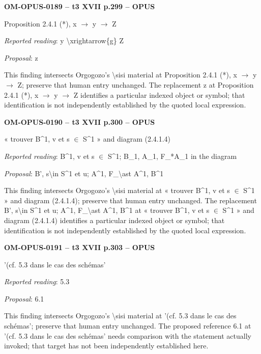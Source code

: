 \par\noindent\textbf{OM-OPUS-0189 -- t3 XVII p.299 -- OPUS}\par
Proposition 2.4.1 (*), x \ensuremath{\to} y \ensuremath{\to} Z\par
\emph{Reported reading}: y \textbackslash{}xrightarrow\{g\} Z\par
\emph{Proposal}: z\par
This finding intersects Orgogozo's \textbackslash{}sisi material at Proposition 2.4.1 (*), x \ensuremath{\to} y \ensuremath{\to} Z; preserve that human entry unchanged. The replacement z at Proposition 2.4.1 (*), x \ensuremath{\to} y \ensuremath{\to} Z identifies a particular indexed object or symbol; that identification is not independently established by the quoted local expression.\par
\par\noindent\textbf{OM-OPUS-0190 -- t3 XVII p.300 -- OPUS}\par
« trouver B\textasciicircum{}1, v et s \ensuremath{\in} S\textasciicircum{}1 » and diagram (2.4.1.4)\par
\emph{Reported reading}: B\textasciicircum{}1, v et s \ensuremath{\in} S\textasciicircum{}1; B\_1, A\_1, F\_*A\_1 in the diagram\par
\emph{Proposal}: B', s\textbackslash{}in S\textasciicircum{}1 et u; A\textasciicircum{}1, F\_\textbackslash{}ast A\textasciicircum{}1, B\textasciicircum{}1\par
This finding intersects Orgogozo's \textbackslash{}sisi material at « trouver B\textasciicircum{}1, v et s \ensuremath{\in} S\textasciicircum{}1 » and diagram (2.4.1.4); preserve that human entry unchanged. The replacement B', s\textbackslash{}in S\textasciicircum{}1 et u; A\textasciicircum{}1, F\_\textbackslash{}ast A\textasciicircum{}1, B\textasciicircum{}1 at « trouver B\textasciicircum{}1, v et s \ensuremath{\in} S\textasciicircum{}1 » and diagram (2.4.1.4) identifies a particular indexed object or symbol; that identification is not independently established by the quoted local expression.\par
\par\noindent\textbf{OM-OPUS-0191 -- t3 XVII p.303 -- OPUS}\par
'(cf. 5.3 dans le cas des schémas'\par
\emph{Reported reading}: 5.3\par
\emph{Proposal}: 6.1\par
This finding intersects Orgogozo's \textbackslash{}sisi material at '(cf. 5.3 dans le cas des schémas'; preserve that human entry unchanged. The proposed reference 6.1 at '(cf. 5.3 dans le cas des schémas' needs comparison with the statement actually invoked; that target has not been independently established here.\par
